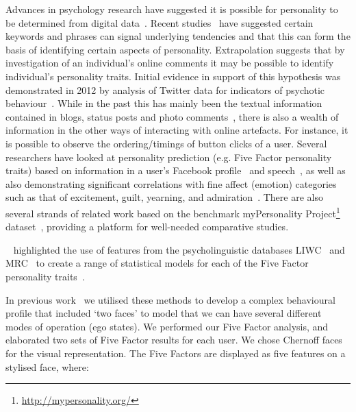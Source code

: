 \documentclass[letterpaper]{article}
\begin{document}
Advances in psychology research have suggested it is possible for
personality to be determined from digital
data~\cite{pennebaker+king:1999,vazire+gosling:2004,iacobelli-et-al:2011}.
Recent studies~\cite{woodworth-et-al:2012} have suggested certain
keywords and phrases can signal underlying tendencies and that this
can form the basis of identifying certain aspects of personality.
Extrapolation suggests that by investigation of an individual's online
comments it may be possible to identify individual's personality
traits. Initial evidence in support of this hypothesis was
demonstrated in 2012 by analysis of Twitter data for indicators of
psychotic behaviour~\cite{sumner-et-al:2012}. While in the past this
has mainly been the textual information contained in blogs, status
posts and photo comments~\cite{blamey-et-al-2012,blamey-et-al-2013},
there is also a wealth of information in the other ways of interacting
with online artefacts. For instance, it is possible to observe the
ordering/timings of button clicks of a user. Several researchers have
looked at personality prediction (e.g. Five Factor personality traits)
based on information in a user's Facebook
profile~\cite{back-et-al:2010,golbeck-et-al:2001} and
speech~\cite{chung+pennebaker:2007,tausczik+pennebaker:2010}, as well
as also demonstrating significant correlations with fine affect
(emotion) categories such as that of excitement, guilt, yearning, and
admiration~\cite{mohammad+kiritchenko:2013}. There are also several
strands of related work based on the benchmark myPersonality
Project\footnote{\url{http://mypersonality.org/}}
dataset~\cite{celli-et-al:2013}, providing a platform for well-needed
comparative studies.

\citeauthor{mairesse-et-al:2007}~
highlighted the use of features from the psycholinguistic databases
LIWC~\cite{pennebaker-et-al:2001} and MRC~\cite{wilson:1988} to create
a range of statistical models for each of the Five Factor personality
traits~\cite{norman:1963,peabody+goldberg:1989}.

In previous work~\cite{oatley+crick:2014} we utilised these methods to
develop a complex behavioural profile that included `two faces' to
model that we can have several different modes of operation (ego
states). We performed our Five Factor analysis, and elaborated two
sets of Five Factor results for each user. We chose Chernoff
faces~\cite{chernoff:1973} for the visual representation. The Five
Factors are displayed as five features on a stylised face, where:
\end{document}

